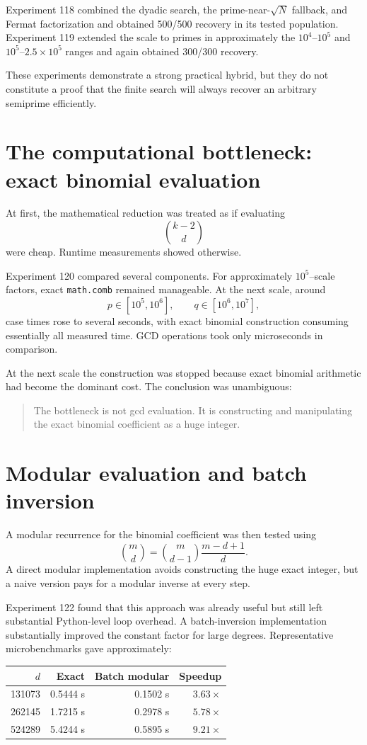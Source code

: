 \documentclass[11pt,a4paper]{article}
\begin{document}
Experiment 118 combined the dyadic search, the prime-near-$\sqrt N$ fallback, and Fermat factorization and obtained 500/500 recovery in its tested population. Experiment 119 extended the scale to primes in approximately the $10^4$--$10^5$ and $10^5$--$2.5\times10^5$ ranges and again obtained 300/300 recovery.

These experiments demonstrate a strong practical hybrid, but they do not constitute a proof that the finite search will always recover an arbitrary semiprime efficiently.

\section{The computational bottleneck: exact binomial evaluation}
\label{sec:runtime}

At first, the mathematical reduction was treated as if evaluating
\[
\binom{k-2}{d}
\]
were cheap. Runtime measurements showed otherwise.

Experiment 120 compared several components. For approximately $10^5$--scale factors, exact \texttt{math.comb} remained manageable. At the next scale, around
\[
p\in[10^5,10^6],
\qquad q\in[10^6,10^7],
\]
case times rose to several seconds, with exact binomial construction consuming essentially all measured time. GCD operations took only microseconds in comparison.

At the next scale the construction was stopped because exact binomial arithmetic had become the dominant cost. The conclusion was unambiguous:

\begin{quote}
The bottleneck is not gcd evaluation. It is constructing and manipulating the exact binomial coefficient as a huge integer.
\end{quote}

\section{Modular evaluation and batch inversion}
\label{sec:modular}

A modular recurrence for the binomial coefficient was then tested using
\[
\binom{m}{d}
=
\binom{m}{d-1}\frac{m-d+1}{d}.
\]
A direct modular implementation avoids constructing the huge exact integer, but a naive version pays for a modular inverse at every step.

Experiment 122 found that this approach was already useful but still left substantial Python-level loop overhead. A batch-inversion implementation substantially improved the constant factor for large degrees. Representative microbenchmarks gave approximately:
\begin{center}
\begin{tabular}{rrrr}
\toprule
$d$ & Exact & Batch modular & Speedup \\
\midrule
131073 & 0.5444 s & 0.1502 s & $3.63\times$\\
262145 & 1.7215 s & 0.2978 s & $5.78\times$\\
524289 & 5.4244 s & 0.5895 s & $9.21\times$\\
\bottomrule
\end{tabular}
\end{center}
\end{document}
